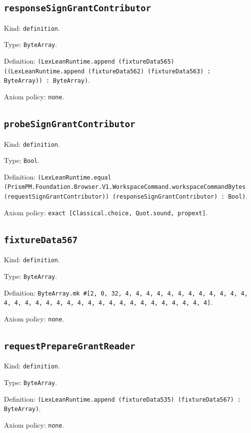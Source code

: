 \documentclass[11pt]{article}
\begin{document}
\subsection*{\texttt{responseSignGrantContributor}}
\noindent Kind: \texttt{definition}.\par
\noindent Type: \texttt{ByteArray}.\par
\noindent Definition: \texttt{(LexLeanRuntime.append (fixtureData565) ((LexLeanRuntime.append (fixtureData562) (fixtureData563) : ByteArray)) : ByteArray)}.\par
\noindent Axiom policy: \texttt{none}.\par
\subsection*{\texttt{probeSignGrantContributor}}
\noindent Kind: \texttt{definition}.\par
\noindent Type: \texttt{Bool}.\par
\noindent Definition: \texttt{(LexLeanRuntime.equal (PrismPM.Foundation.Browser.V1.WorkspaceCommand.workspaceCommandBytes (requestSignGrantContributor)) (responseSignGrantContributor) : Bool)}.\par
\noindent Axiom policy: \texttt{exact [Classical.choice, Quot.sound, propext]}.\par
\subsection*{\texttt{fixtureData567}}
\noindent Kind: \texttt{definition}.\par
\noindent Type: \texttt{ByteArray}.\par
\noindent Definition: \texttt{ByteArray.mk \#[2, 0, 32, 4, 4, 4, 4, 4, 4, 4, 4, 4, 4, 4, 4, 4, 4, 4, 4, 4, 4, 4, 4, 4, 4, 4, 4, 4, 4, 4, 4, 4, 4, 4, 4]}.\par
\noindent Axiom policy: \texttt{none}.\par
\subsection*{\texttt{requestPrepareGrantReader}}
\noindent Kind: \texttt{definition}.\par
\noindent Type: \texttt{ByteArray}.\par
\noindent Definition: \texttt{(LexLeanRuntime.append (fixtureData535) (fixtureData567) : ByteArray)}.\par
\noindent Axiom policy: \texttt{none}.\par
\end{document}
